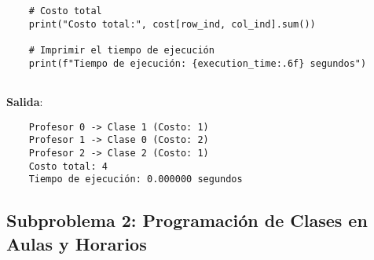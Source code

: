 \documentclass[12pt, a4paper]{article}
\begin{document}
\begin{itemize}
\begin{verbatim}
    # Costo total
    print("Costo total:", cost[row_ind, col_ind].sum())
    
    # Imprimir el tiempo de ejecución
    print(f"Tiempo de ejecución: {execution_time:.6f} segundos")
    
    \end{verbatim}
    
    \textbf{Salida}:
    \begin{verbatim}
    Profesor 0 -> Clase 1 (Costo: 1)
    Profesor 1 -> Clase 0 (Costo: 2)
    Profesor 2 -> Clase 2 (Costo: 1)
    Costo total: 4
    Tiempo de ejecución: 0.000000 segundos
    \end{verbatim}
    
\end{itemize}

\subsection{Subproblema 2: Programación de Clases en Aulas y Horarios}
\end{document}
